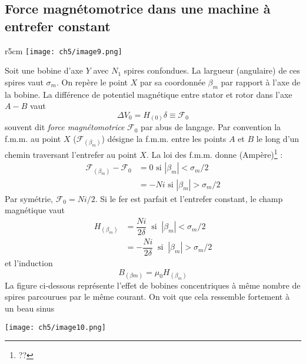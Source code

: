 	\subsection{Force magnétomotrice dans une machine à entrefer constant}
		\begin{wrapfigure}[11]{r}{5cm}
	\vspace{-5mm}
	\texttt{[image: ch5/image9.png]}
	\end{wrapfigure}
	Soit une bobine d'axe $Y$ avec $N_1$ spires confondues. La largueur (angulaire) de 
	ces spires vaut $\sigma_m$. On repère le point $X$ par sa coordonnée $\beta_m$ par 
	rapport à l'axe de la bobine. La différence de potentiel magnétique entre stator 
	et rotor dans l'axe $A-B$ vaut 
	\begin{equation}
	\Delta V_0 = H_{(0)}\delta \equiv \mathcal{F}_0
	\end{equation}
	souvent dit \textit{force magnétomotrice} $\mathcal{F}_0$ par abus de langage. Par 
	convention la f.m.m. au point $X$ ($\mathcal{F}_{(\beta_m)}$) désigne la f.m.m. entre 
	les points $A$ et $B$ le long d'un chemin traversant l'entrefer au point $X$. La loi 
	des f.m.m. donne (Ampère)\footnote{??} :
	\begin{equation}
	\begin{array}{ll}
	\mathcal{F}_{(\beta_m)} - \mathcal{F}_0 &= 0  \text{ si } |\beta_m|<\sigma_m/2\\
	&= -Ni  \text{ si } |\beta_m|>\sigma_m/2
	\end{array}
	\end{equation}
	Par symétrie, $\mathcal{F}_0 = Ni/2$. Si le fer est parfait et l'entrefer constant, 
	le champ magnétique vaut 
	\begin{equation}
	\begin{array}{ll}
	H_{(\beta_m)} &= \dfrac{Ni}{2\delta}\ \text{ si }\ |\beta_m|<\sigma_m/2\\
	&= -\dfrac{Ni}{2\delta}\ \text{ si }\ |\beta_m|>\sigma_m/2
	\end{array}
	\end{equation}
	et l'induction
	\begin{equation}
	B_{(\beta m)} = \mu_0H_{(\beta_m)}
	\end{equation}
	La figure ci-dessous représente l'effet de bobines concentriques à même nombre de 
	spires parcourues par le même courant. On voit que cela ressemble fortement à un 
	beau sinus
	\begin{center}
	\texttt{[image: ch5/image10.png]}
	\end{center}
	
